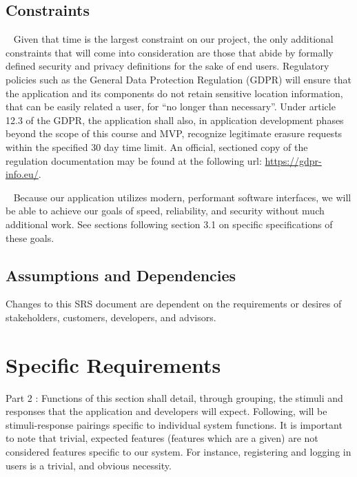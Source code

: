 \documentclass{scrreprt}
\begin{document}
\section{Constraints}
\par ~ Given that time is the largest constraint on our project, the only additional constraints that will come into consideration are those that abide by formally defined security and privacy definitions for the sake of end users. Regulatory policies such as the General Data Protection Regulation (GDPR) will ensure that the application and its components do not retain sensitive location information, that can be easily related a user, for ``no longer than necessary''. Under article 12.3 of the GDPR, the application shall also, in application development phases beyond the scope of this course and MVP, recognize legitimate erasure requests within the specified 30 day time limit. An official, sectioned copy of the regulation documentation may be found at the following url: \url{https://gdpr-info.eu/}.

\par ~ Because our application utilizes modern, performant software interfaces, we will be able to achieve our goals of speed, reliability, and security without much additional work. See sections following section 3.1 on specific specifications of these goals.


\section{Assumptions and Dependencies}
Changes to this SRS document are dependent on the requirements or desires of stakeholders, customers, developers, and advisors. 


\chapter{Specific Requirements}
Part 2 : Functions of this section shall detail, through grouping, the stimuli and responses that the application and developers will expect. Following, will be stimuli-response pairings specific to individual system functions. It is important to note that trivial, expected features (features which are a given) are not considered features specific to our system. For instance, registering and logging in users is a trivial, and obvious necessity.
\end{document}
